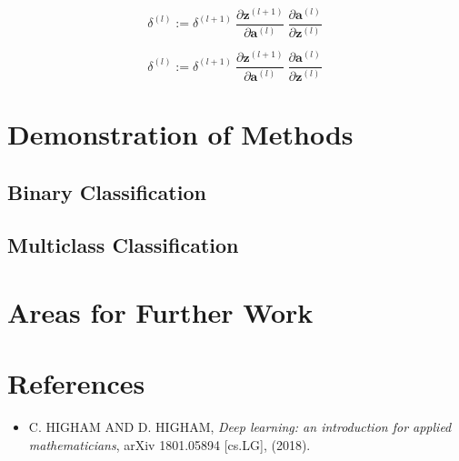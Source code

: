 \documentclass{article}
\begin{document}
        
        
        $$
        \delta^{(l)} :=
        \delta^{(l+1)} \
        \frac{\partial \mathbf{z}^{(l+1)}}{\partial \mathbf{a}^{(l)}} \
        \frac{\partial \mathbf{a}^{(l)}}{\partial \mathbf{z}^{(l)}} \
        $$
        
        
        
        $$
        \delta^{(l)} :=
            \delta^{(l+1)} \
            \frac{\partial \mathbf{z}^{(l+1)}}{\partial \mathbf{a}^{(l)}} \
            \frac{\partial \mathbf{a}^{(l)}}{\partial \mathbf{z}^{(l)}} \
        $$
        
        
        
        
        
        






\section{Demonstration of Methods}

    \subsection{Binary Classification}
    
    \subsection{Multiclass Classification}
    



\section{Areas for Further Work}    




\section*{References}

	\begin{itemize}
	
		\item[] C. HIGHAM AND D. HIGHAM, \textit{Deep learning: an introduction for applied mathematicians}, arXiv 1801.05894 [cs.LG], (2018).

	\end{itemize}
\end{document}
